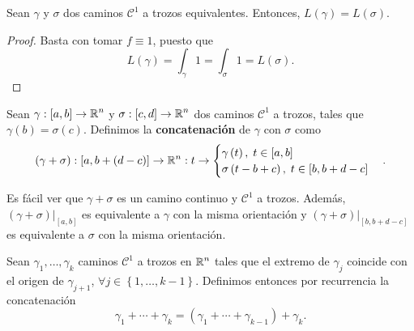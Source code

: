 \begin{colorary}
Sean $\displaystyle \gamma  $ y $\displaystyle \sigma  $ dos caminos $\displaystyle \mathcal{C}^{1} $ a trozos equivalentes. Entonces, $\displaystyle L\left(\gamma \right)= L\left(\sigma \right) $. 
\end{colorary}
\begin{proof}
Basta con tomar $\displaystyle f \equiv 1 $, puesto que 
\[L\left(\gamma \right)= \int _{\gamma }1 =\int _{\sigma }1 =L\left(\sigma \right) .\]
\end{proof}
\begin{definition}
	Sean $\displaystyle \gamma:\left[a,b\right] \to \mathbb{R}^{n} $ y $\displaystyle \sigma:\left[c,d\right] \to \mathbb{R}^{n} $ dos caminos $\displaystyle \mathcal{C}^{1} $ a trozos, tales que $\displaystyle \gamma\left(b\right)=\sigma\left(c\right) $. Definimos la \textbf{concatenación} de $\displaystyle \gamma  $ con $\displaystyle \sigma  $ como 
	\[\left(\gamma + \sigma \right):\left[a,b+\left(d-c\right)\right] \to \mathbb{R}^{n} : t \to 
	\begin{cases}
		\gamma\left(t\right), \; t \in \left[a,b\right] \\
		\sigma\left(t-b+c\right), \; t \in \left[b,b + d-c\right] 
	\end{cases}
	.\]
\end{definition}
\begin{observation}
	Es fácil ver que $\displaystyle \gamma + \sigma  $ es un camino continuo y $\displaystyle \mathcal{C}^{1} $ a trozos. Además, $\displaystyle \left(\gamma+\sigma \right)|_{\left[a,b\right] } $ es equivalente a $\displaystyle \gamma  $ con la misma orientación y $\displaystyle \left(\gamma + \sigma \right)|_{\left[b, b+ d-c\right] } $ es equivalente a $\displaystyle \sigma  $ con la misma orientación. 
\end{observation}
\begin{definition}
	Sean $\displaystyle \gamma_{1}, \ldots, \gamma_{k} $ caminos $\displaystyle \mathcal{C}^{1} $ a trozos en $\displaystyle \mathbb{R}^{n} $ tales que el extremo de $\displaystyle \gamma_{j} $ coincide con el origen de $\displaystyle \gamma_{j + 1} $, $\displaystyle \forall j \in \left\{ 1, \ldots, k - 1\right\}  $. Definimos entonces por recurrencia la concatenación
	\[\gamma_{1} + \cdots + \gamma_{k} = \left(\gamma_{1} + \cdots + \gamma_{k-1}\right)+\gamma_{k} .\]
\end{definition}
